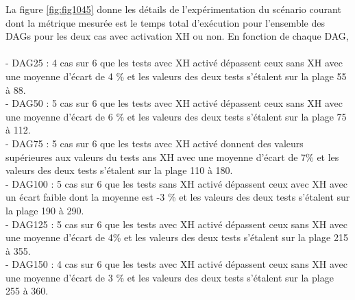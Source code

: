 La figure \ref{fig:fig1045} donne les détails de l'expérimentation du scénario courant dont la métrique mesurée est le temps total d'exécution pour l'ensemble des DAGs pour les deux cas avec activation XH ou non. En fonction de chaque DAG, \\
\\
- DAG25 : 4 cas sur 6 que les tests avec XH activé dépassent ceux sans XH avec une moyenne d'écart de 4 \% et les valeurs des deux tests s'étalent sur la plage 55 à 88.\\
- DAG50 : 5 cas sur 6 que les tests avec XH activé dépassent ceux sans XH avec une moyenne d'écart de 6 \% et les valeurs des deux tests s'étalent sur la plage 75 à 112.\\
- DAG75 : 5 cas sur 6 que les tests avec XH activé donnent des valeurs supérieures aux valeurs du tests ans XH avec une moyenne d'écart de 7\% et les valeurs des deux tests s'étalent sur la plage 110 à 180.\\
- DAG100 : 5 cas sur 6 que les tests sans XH activé dépassent ceux avec XH avec un écart faible dont la moyenne est -3 \% et les valeurs des deux tests s'étalent sur la plage 190 à 290.\\
- DAG125 : 5 cas sur 6 que les tests avec XH activé dépassent ceux sans XH avec une moyenne d'écart de 4\% et les valeurs des deux tests s'étalent sur la plage 215 à 355.\\
- DAG150 : 4 cas sur 6 que les tests avec XH activé dépassent ceux sans XH avec une moyenne d'écart de 3 \% et les valeurs des deux tests s'étalent sur la plage 255 à 360.

